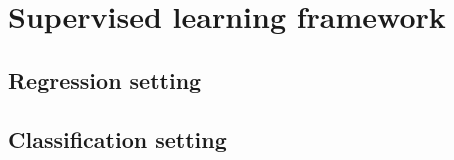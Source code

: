 \section{Supervised learning framework}




\subsection{Regression setting}


\subsection{Classification setting}